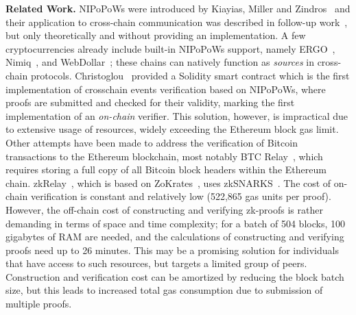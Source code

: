\noindent
\textbf{Related Work.} NIPoPoWs
were introduced by Kiayias, Miller and Zindros~\cite{nipopows} and their
application to cross-chain communication was described in follow-up
work~\cite{pow-sidechains}, but only theoretically and without providing
an implementation. A few cryptocurrencies already
include built-in NIPoPoWs support, namely ERGO~\cite{ergo}, Nimiq~\cite{nimiq}, and
WebDollar~\cite{webdollar}; these chains can natively function as \emph{sources}
in cross-chain protocols.
Christoglou~\cite{gglou} provided a Solidity smart contract which is the first
implementation of crosschain events verification based on NIPoPoWs, where
proofs are submitted and checked for their validity, marking the first
implementation of an \emph{on-chain} verifier. This solution, however, is
impractical due to extensive usage of resources, widely exceeding the Ethereum
block gas limit.
Other attempts have been made to address the verification of Bitcoin
transactions to the Ethereum blockchain, most notably BTC
Relay~\cite{btcrelay}, which requires storing a full copy of all Bitcoin
block headers within the Ethereum chain.
zkRelay~\cite{zkrelay}, which is based on ZoKrates~\cite{zokrates}, uses
zkSNARKS~\cite{zksnarks}. The cost of on-chain verification is constant and
relatively low (522,865 gas units per proof). However, the off-chain cost of
constructing and verifying zk-proofs is rather demanding in terms of space and
time complexity; for a batch of 504 blocks, 100 gigabytes of RAM are needed, and
the calculations of constructing and verifying proofs need up to 26 minutes.
This may be a promising solution for individuals that have access to such
resources, but targets a limited group of peers. Construction and verification
cost can be amortized by reducing the block batch size, but this leads to
increased total gas consumption due to submission of multiple proofs.

